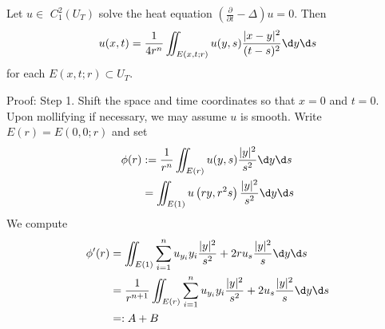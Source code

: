 \begin{theorem}
    Let $u \in$ $C_1^2\left(U_T\right)$ solve the heat equation $\left(\frac{\partial}{\partial t} - \Delta\right) u = 0$. Then
    \begin{equation*}
        u(x, t)=\frac{1}{4 r^n} \iint_{E(x, t ; r)} u(y, s) \frac{|x-y|^2}{(t-s)^2} \d y \d s
    \end{equation*}
    for each $E(x, t ; r) \subset U_T$.

    Proof:
    Step 1.
    Shift the space and time coordinates so that $x=0$ and $t=0$. Upon mollifying if necessary, we may assume $u$ is smooth. Write $E(r)=E(0,0 ; r)$ and set
    \begin{equation*}
        \begin{aligned}
            \phi(r) & :=\frac{1}{r^n} \iint_{E(r)} u(y, s) \frac{|y|^2}{s^2} \d y \d s   \\
                    & =\iint_{E(1)} u\left(r y, r^2 s\right) \frac{|y|^2}{s^2} \d y \d s
        \end{aligned}
    \end{equation*}
    We compute
    \begin{equation*}
        \begin{aligned}
            \phi^{\prime}(r) & =\iint_{E(1)} \sum_{i=1}^n u_{y_i} y_i \frac{|y|^2}{s^2}+2 r u_s \frac{|y|^2}{s} \d y \d s                 \\
                             & =\frac{1}{r^{n+1}} \iint_{E(r)} \sum_{i=1}^n u_{y_i} y_i \frac{|y|^2}{s^2}+2 u_s \frac{|y|^2}{s} \d y \d s \\
                             & =: A+B
        \end{aligned}
    \end{equation*}


\end{theorem}
